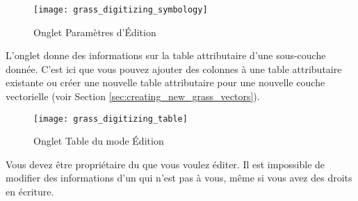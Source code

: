 \begin{figure}[ht]
 \begin{center}
 \texttt{[image: grass\_digitizing\_symbology]}
  \caption{Onglet Paramètres d'Édition \grass \nixcaption}\label{fig:grass_digitizing_settings}
 \end{center}
\end{figure}

 
L'onglet  donne des informations sur la table attributaire d'une sous-couche donnée. C'est ici que vous pouvez ajouter des colonnes à une table attributaire existante ou créer une nouvelle table attributaire pour une nouvelle couche vectorielle \grass (voir Section \ref{sec:creating_new_grass_vectors}).

\begin{figure}[ht]
 \begin{center}
 \texttt{[image: grass\_digitizing\_table]}
  \caption{Onglet Table du mode Édition \grass \nixcaption}\label{fig:grass_digitizing_table}
 \end{center}
\end{figure}

\begin{Tip}\caption{\textsc{Éditer les permissions \grass}}
Vous devez être propriétaire du  que vous voulez éditer. Il est impossible de modifier des informations d'un  qui n'est pas à vous, même si vous avez des droits en écriture.
\end{Tip} 

